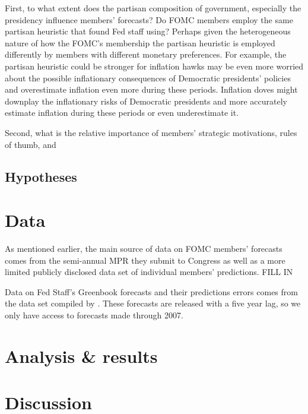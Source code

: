 \documentclass[a4paper]{article}\usepackage{graphicx, color}
\begin{document}
First, to what extent does the partisan composition of government, especially the presidency influence members' forecasts? Do FOMC members employ the same partisan heuristic that \cite{gandrud2013does} found Fed staff using? Perhaps given the heterogeneous nature of how the FOMC's membership the partisan heuristic is employed differently by members with different monetary preferences. For example, the partisan heuristic could be stronger for inflation hawks may be even more worried about the possible inflationary consequences of Democratic presidents' policies and overestimate inflation even more during these periods. Inflation doves might downplay the inflationary risks of Democratic presidents and more accurately estimate inflation during these periods or even underestimate it.

Second, what is the relative importance of members' strategic motivations, rules of thumb, and   

\subsection{Hypotheses}

\section{Data}

As mentioned earlier, the main source of data on FOMC members' forecasts comes from the semi-annual MPR they submit to Congress as well as a more limited publicly disclosed data set of individual members' predictions. FILL IN

Data on Fed Staff's Greenbook forecasts and their predictions errors comes from the data set compiled by \cite{gandrud2013does}. These forecasts are released with a five year lag, so we only have access to forecasts made through 2007.


\section{Analysis \& results}

\section*{Discussion}



\clearpage



\end{document}
